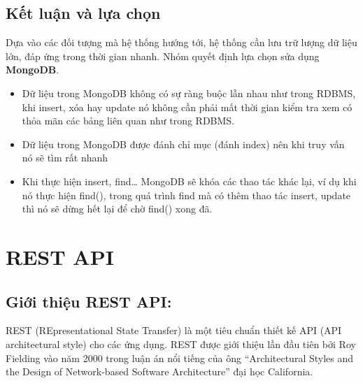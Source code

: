 \subsection{Kết luận và lựa chọn}

Dựa vào các đối tượng mà hệ thống hướng tới, hệ thống cần lưu trữ lượng dữ liệu lớn, đáp ứng trong thời gian nhanh. Nhóm quyết định lựa chọn sửa dụng \textbf{MongoDB}.\\
\begin{itemize}
    \item Dữ liệu trong MongoDB không có sự ràng buộc lẫn nhau như trong RDBMS, khi insert, xóa hay update nó không cần phải mất thời gian kiểm tra xem có thỏa mãn các bảng liên quan như trong RDBMS.
    \item Dữ liệu trong MongoDB được đánh chỉ mục (đánh index) nên khi truy vấn nó sẽ tìm rất nhanh
    \item Khi thực hiện insert, find… MongoDB sẽ khóa các thao tác khác lại, ví dụ khi nó thực hiện find(), trong quá trình find mà có thêm thao tác insert, update thì nó sẽ dừng hết lại để chờ find() xong đã.

\end{itemize}




\section{REST API}
\subsection{Giới thiệu REST API:}
REST (REpresentational State Transfer) là một tiêu chuẩn thiết kế API (API architectural style) cho các ứng dụng. REST được giới thiệu lần đầu tiên bởi Roy Fielding vào năm 2000 trong luận án nổi tiếng của ông ``Architectural Styles and
the Design of Network-based Software Architecture'' đại học California.

